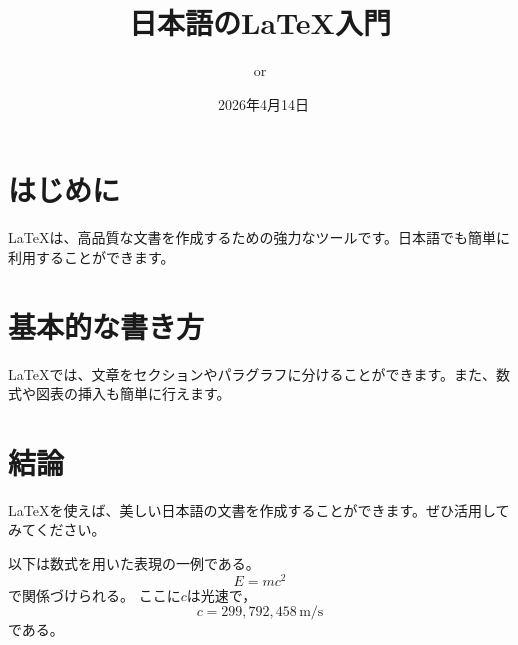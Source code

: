 \documentclass{ltjsarticle}
\title{日本語のLaTeX入門}
\author{or}
\date{\ 2026年4月14日}
\begin{document}
\maketitle

\section{はじめに}
LaTeXは、高品質な文書を作成するための強力なツールです。日本語でも簡単に利用することができます。

\section{基本的な書き方}
LaTeXでは、文章をセクションやパラグラフに分けることができます。また、数式や図表の挿入も簡単に行えます。

\section{結論}
LaTeXを使えば、美しい日本語の文書を作成することができます。ぜひ活用してみてください。

以下は数式を用いた表現の一例である。
\begin{equation}
  E = mc^{2}
\end{equation}
で関係づけられる。
ここに$c$は光速で，
\begin{equation}
  c = 299{,}792{,}458 \, \mathrm{m/s}
\end{equation}
である。
\end{document}
